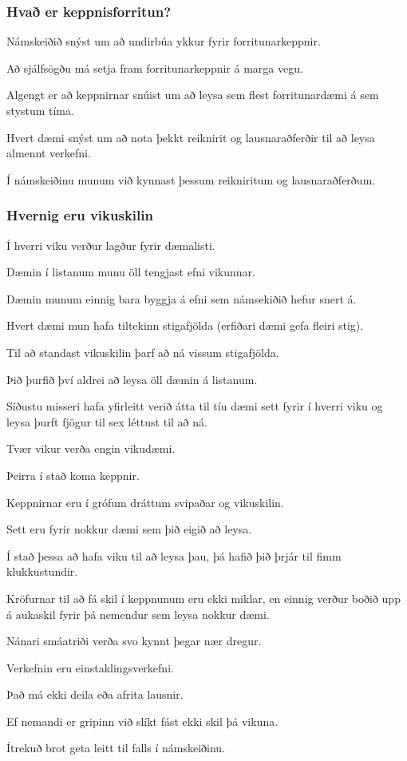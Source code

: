 {
	\frametitle{Hvað er keppnisforritun?}
	{
		\item<1-> Námskeiðið snýst um að undirbúa ykkur fyrir forritunarkeppnir.
		\item<2-> Að sjálfsögðu má setja fram forritunarkeppnir á marga vegu.
		\item<3-> Algengt er að keppnirnar snúist um að leysa sem flest forritunardæmi á sem stystum tíma.
		\item<4-> Hvert dæmi snýst um að nota þekkt reiknirit og lausnaraðferðir til að leysa almennt verkefni.
		\item<5-> Í námskeiðinu munum við kynnast þessum reikniritum og lausnaraðferðum.
	}
}

{
	\frametitle{Hvernig eru vikuskilin}
	{
		\item<1-> Í hverri viku verður lagður fyrir dæmalisti.
		\item<2-> Dæmin í listanum munu öll tengjast efni vikunnar.
		\item<3-> Dæmin munum einnig bara byggja á efni sem námsekiðið hefur snert á.
		\item<4-> Hvert dæmi mun hafa tiltekinn stigafjölda (erfiðari dæmi gefa fleiri stig).
		\item<5-> Til að standast vikuskilin þarf að ná vissum stigafjölda.
		\item<6-> Þið þurfið því aldrei að leysa öll dæmin á listanum.
		\item<7-> Síðustu misseri hafa yfirleitt verið átta til tíu dæmi sett fyrir í hverri viku og leysa þurft fjögur til sex léttust til að ná.
	}
}

{
	{
		\item<1-> Tvær vikur verða engin vikudæmi.
		\item<2-> Þeirra í stað koma keppnir.
		\item<3-> Keppnirnar eru í grófum dráttum svipaðar og vikuskilin.
		\item<4-> Sett eru fyrir nokkur dæmi sem þið eigið að leysa.
		\item<5-> Í stað þessa að hafa viku til að leysa þau, þá hafið þið þrjár til fimm klukkustundir.
		\item<6-> Kröfurnar til að fá skil í keppnunum eru ekki miklar, en einnig verður boðið upp á aukaskil fyrir þá nemendur sem leysa nokkur dæmi.
		\item<7-> Nánari smáatriði verða svo kynnt þegar nær dregur.
	}
}

{
	{
		\item<1-> Verkefnin eru einstaklingsverkefni.
		\item<2-> Það má ekki deila eða afrita lausnir.
		\item<3-> Ef nemandi er gripinn við slíkt fást ekki skil þá vikuna.
		\item<4-> Ítrekuð brot geta leitt til falls í námskeiðinu.
	}
}

